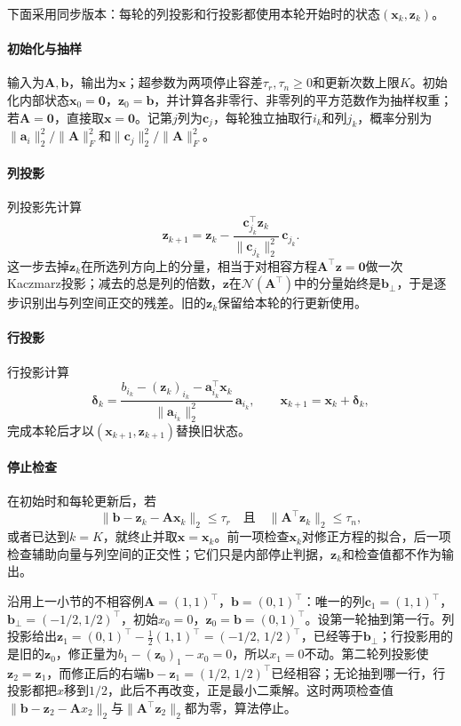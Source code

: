 下面采用同步版本：每轮的列投影和行投影都使用本轮开始时的状态$(\bm x_k,\bm z_k)$。

\paragraph{初始化与抽样}
输入为$\bm A,\bm b$，输出为$\bm x$；超参数为两项停止容差$\tau_r,\tau_n\geq0$和更新次数上限$K$。初始化内部状态$\bm x_0=\bm 0$，$\bm z_0=\bm b$，并计算各非零行、非零列的平方范数作为抽样权重；若$\bm A=\bm 0$，直接取$\bm x=\bm 0$。记第$j$列为$\bm c_j$，每轮独立抽取行$i_k$和列$j_k$，概率分别为$\lVert\bm a_i\rVert_2^2/\lVert\bm A\rVert_F^2$和$\lVert\bm c_j\rVert_2^2/\lVert\bm A\rVert_F^2$。

\paragraph{列投影}
列投影先计算
\[
\bm z_{k+1}=\bm z_k-\frac{\bm c_{j_k}^\top\bm z_k}{\lVert\bm c_{j_k}\rVert_2^2}\,\bm c_{j_k}.
\]
这一步去掉$\bm z_k$在所选列方向上的分量，相当于对相容方程$\bm A^\top\bm z=\bm 0$做一次Kaczmarz投影；减去的总是列的倍数，$\bm z$在$\mathcal N(\bm A^\top)$中的分量始终是$\bm b_\perp$，于是逐步识别出与列空间正交的残差。旧的$\bm z_k$保留给本轮的行更新使用。

\paragraph{行投影}
行投影计算
\[
\bm\delta_k=\frac{b_{i_k}-(\bm z_k)_{i_k}-\bm a_{i_k}^\top\bm x_k}{\lVert\bm a_{i_k}\rVert_2^2}\,\bm a_{i_k},\qquad
\bm x_{k+1}=\bm x_k+\bm\delta_k ,
\]
完成本轮后才以$(\bm x_{k+1},\bm z_{k+1})$替换旧状态。

\paragraph{停止检查}
在初始时和每轮更新后，若
\[
\lVert\bm b-\bm z_k-\bm A\bm x_k\rVert_2\leq\tau_r
\quad\text{且}\quad
\lVert\bm A^\top\bm z_k\rVert_2\leq\tau_n ,
\]
或者已达到$k=K$，就终止并取$\bm x=\bm x_k$。前一项检查$\bm x_k$对修正方程的拟合，后一项检查辅助向量与列空间的正交性；它们只是内部停止判据，$\bm z_k$和检查值都不作为输出。

\begin{example}[扩展Kaczmarz算法的前两轮]
\label{ex:ls-extended-kaczmarz-two-rounds}
沿用上一小节的不相容例$\bm A=(1,1)^\top$，$\bm b=(0,1)^\top$：唯一的列$\bm c_1=(1,1)^\top$，$\bm b_\perp=(-1/2,1/2)^\top$，初始$x_0=0$，$\bm z_0=\bm b=(0,1)^\top$。设第一轮抽到第一行。列投影给出$\bm z_1=(0,1)^\top-\tfrac12(1,1)^\top=(-1/2,\,1/2)^\top$，已经等于$\bm b_\perp$；行投影用的是旧的$\bm z_0$，修正量为$b_1-(\bm z_0)_1-x_0=0$，所以$x_1=0$不动。第二轮列投影使$\bm z_2=\bm z_1$，而修正后的右端$\bm b-\bm z_1=(1/2,\,1/2)^\top$已经相容；无论抽到哪一行，行投影都把$x$移到$1/2$，此后不再改变，正是最小二乘解。这时两项检查值$\lVert\bm b-\bm z_2-\bm A x_2\rVert_2$与$\lVert\bm A^\top\bm z_2\rVert_2$都为零，算法停止。
\end{example}

